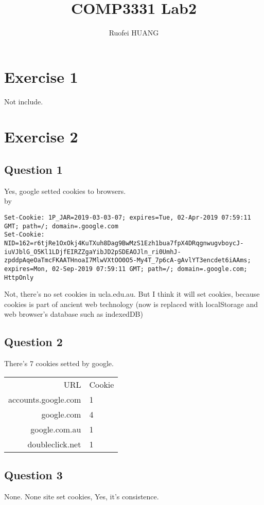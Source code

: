 \documentclass{article}
\begin{document}
\title{COMP3331 Lab2}
\author{Ruofei HUANG}

\maketitle
\section{Exercise 1}
Not include.
\section{Exercise 2}

\subsection{Question 1}

Yes, google setted cookies to browsers.\\
by \\

\begin{lstlisting}
Set-Cookie: 1P_JAR=2019-03-03-07; expires=Tue, 02-Apr-2019 07:59:11 GMT; path=/; domain=.google.com
Set-Cookie: NID=162=r6tjRe1OxOkj4KuTXuh8Dag9BwMzS1Ezh1bua7fpX4DRqgnwugvboycJ-iuVJblG_O5Kl1LDjfEIRZZgaYibJD2pSDEAOJln_ri0UmhJ-zpddpAqeOaTmcFKAATHnoaI7MlwVXtOO0O5-My4T_7p6cA-gAvlYT3encdet6iAAms; expires=Mon, 02-Sep-2019 07:59:11 GMT; path=/; domain=.google.com; HttpOnly
\end{lstlisting}
Not, there's no set cookies in ucla.edu.au. But I think it will set cookies, because cookies is part of ancient web technology (now is replaced with localStorage and web browser's database such as indexedDB)

\subsection{Question 2}
There's 7 cookies setted by google.

\begin{tabular}{|r|l|}
    URL & Cookie\\
    accounts.google.com& 1\\
    google.com & 4\\
    google.com.au & 1 \\
    doubleclick.net & 1\\
\end{tabular}

\subsection{Question 3}
None. None site set cookies, Yes, it's consistence. 
\end{document}
